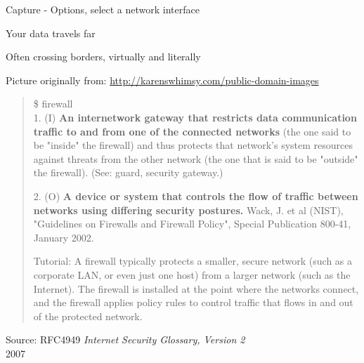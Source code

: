 \documentclass[Screen16to9,17pt]{foils}
\begin{document}


\centerline{Capture - Options, select a network interface}
\centerline{}




\begin{list2}
\item Your data travels far
\item Often crossing borders, virtually and literally
\end{list2}



\centerline{Picture originally from: \url{http://karenswhimsy.com/public-domain-images}}



\begin{quote}\small
\$ firewall\\

1. (I) {\bf An internetwork gateway that restricts data communication traffic to and from one of the connected networks} (the one said to be "inside" the firewall) and thus protects that network's system resources against threats from the other network (the one that is said to be "outside" the firewall). (See: guard, security gateway.)

2. (O) {\bf A device or system that controls the flow of traffic between networks using differing security postures.} Wack, J. et al (NIST), "Guidelines on Firewalls and Firewall Policy", Special Publication 800-41, January 2002.

Tutorial: A firewall typically protects a smaller, secure network (such as a corporate LAN, or even just one host) from a larger network (such as the Internet). The firewall is installed at the point where the networks connect, and the firewall applies policy rules to control traffic that flows in and out of the protected network.
\end{quote}
{\footnotesize Source: RFC4949 \emph{Internet Security Glossary, Version 2}\\
 2007}
\end{document}
